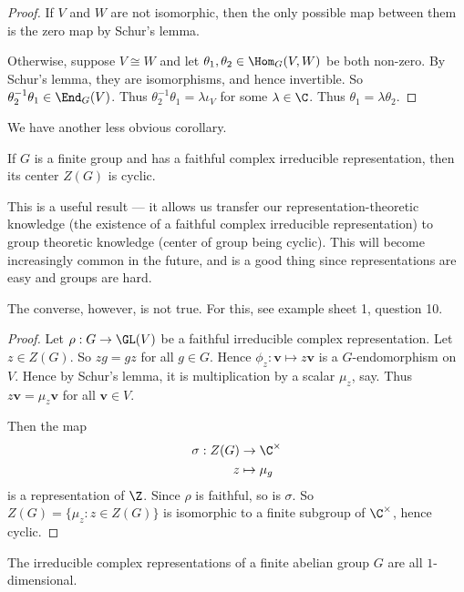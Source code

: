 \documentclass[a4paper]{article}
\begin{document}
\begin{proof}
  If $V$ and $W$ are not isomorphic, then the only possible map between them is the zero map by Schur's lemma.

  Otherwise, suppose $V \cong W$ and let $\theta_1, \theta_2 \in \Hom_G(V, W)$ be both non-zero. By Schur's lemma, they are isomorphisms, and hence invertible. So $\theta_2^{-1}\theta_1 \in \End_G(V)$. Thus $\theta_2^{-1}\theta_1 = \lambda \iota_V$ for some $\lambda \in \C$. Thus $\theta_1 = \lambda \theta_2$.
\end{proof}

We have another less obvious corollary.
\begin{cor}
  If $G$ is a finite group and has a faithful complex irreducible representation, then its center $Z(G)$ is cyclic.
\end{cor}
This is a useful result --- it allows us transfer our representation-theoretic knowledge (the existence of a faithful complex irreducible representation) to group theoretic knowledge (center of group being cyclic). This will become increasingly common in the future, and is a good thing since representations are easy and groups are hard.

The converse, however, is not true. For this, see example sheet 1, question 10.
\begin{proof}
  Let $\rho: G \to \GL(V)$ be a faithful irreducible complex representation. Let $z \in Z(G)$. So $zg = gz$ for all $g \in G$. Hence $\phi_z: \mathbf{v} \mapsto z\mathbf{v}$ is a $G$-endomorphism on $V$. Hence by Schur's lemma, it is multiplication by a scalar $\mu_z$, say. Thus $z\mathbf{v} = \mu_z \mathbf{v}$ for all $\mathbf{v}\in V$.

  Then the map
  \begin{align*}
    \sigma: Z(G) &\to \C^\times\\
    z &\mapsto \mu_g
  \end{align*}
  is a representation of $\Z$. Since $\rho$ is faithful, so is $\sigma$. So $Z(G) = \{\mu_z: z \in Z(G)\}$ is isomorphic to a finite subgroup of $\C^\times$, hence cyclic.
\end{proof}

\begin{cor}
  The irreducible complex representations of a finite abelian group $G$ are all $1$-dimensional.
\end{cor}
\end{document}
